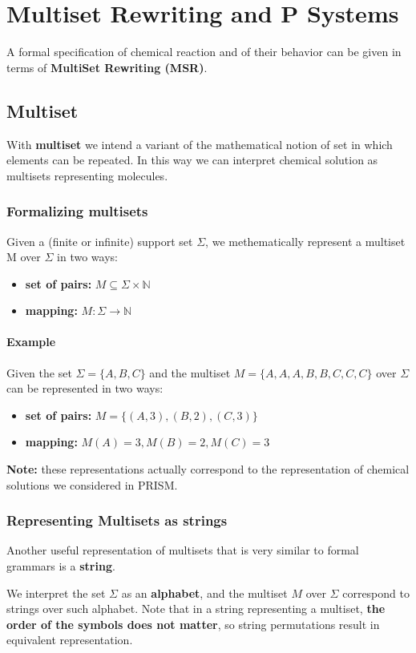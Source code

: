 \chapter{Multiset Rewriting and P Systems}
A formal specification of chemical reaction and of their behavior can be given in terms of \textbf{MultiSet Rewriting (MSR)}.\par

\section{Multiset}
With \textbf{multiset} we intend a variant of the mathematical notion of set in which elements can be repeated. In this way we can interpret chemical solution as multisets representing molecules.

\subsection{Formalizing multisets}
Given a (finite or infinite) support set $\Sigma$, we methematically represent a multiset M over $\Sigma$ in two ways:
\begin{itemize}
    \item \textbf{set of pairs:} $M \subseteq \Sigma \times \mathbb{N}$
    \item \textbf{ mapping:} $M: \Sigma \rightarrow \mathbb{N}$
\end{itemize}

\subsubsection{Example}
Given the set $\Sigma = \{A, B, C\}$ and the multiset $M = \{A, A, A, B, B, C, C, C \}$ over $\Sigma$ can be represented in two ways:

\begin{itemize}
    \item \textbf{set of pairs:} $M = \{ (A, 3), (B, 2), (C, 3) \}$
    \item \textbf{mapping:} $M(A) = 3, M(B) = 2, M(C) = 3$
\end{itemize}

\textbf{Note:} these representations actually correspond to the representation of chemical solutions we considered in PRISM.

\subsection{Representing Multisets as strings}
Another useful representation of multisets that is very similar to formal grammars is a \textbf{string}.\par
We interpret the set $\Sigma$ as an \textbf{alphabet}, and the multiset $M$ over $\Sigma$ correspond to strings over such alphabet. Note that in a string representing a multiset, \textbf{the order of the symbols does not matter}, so string permutations result in equivalent representation.

